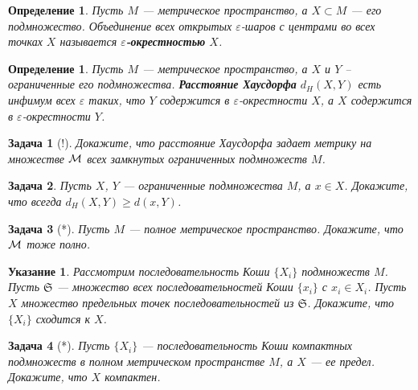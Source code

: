 \documentclass[12pt]{book}
\renewcommand{\epsilon}{\varepsilon}
\theoremstyle{upshape}
\newtheorem{zadacha}{Задача}[chapter]
\theoremstyle{generic}
\newtheorem{opredelenie}[teorema]{Определение}
\theoremstyle{upshapenonumber}
\newtheorem{ukazanie}{Указание}[section]
\newcommand{\следствие}{%
     \refstepcounter{teorema}
     {\noindent\bf Следствие \thechapter.\arabic{teorema}:\ }}
\newcommand{\пример}{%
     \refstepcounter{teorema}
     {\noindent\bf Пример \thechapter.\arabic{teorema}:\ }}
\newcommand{\лемма}{%
     \refstepcounter{teorema}
     {\noindent\bf Лемма \thechapter.\arabic{teorema}:\ }}
\newcommand{\теорема}{%
     \refstepcounter{teorema}
     {\noindent\bf Теорема \thechapter.\arabic{teorema}:\ }}
\newcommand{\утверждение}{%
     \refstepcounter{teorema}
     {\noindent\bf Утверждение \thechapter.\arabic{teorema}:\ }}
\begin{document}
{\begin{opredelenie} Пусть $M$ --- метрическое пространство,
а $X\subset M$ --- его подмножество. Объединение всех открытых
$\epsilon$-шаров с центрами во всех точках $X$ называется {\bf
$\epsilon$-окрестностью} $X$.
\end{opredelenie}

\begin{opredelenie} Пусть $M$ --- метрическое пространство, а $X$ и $Y$
-- ограниченные его подмножества. {\bf Расстояние Хаусдорфа}
$d_{H}(X,Y)$ есть инфимум всех $\epsilon$ таких, что $Y$ содержится
в $\epsilon$-окрестности $X$, а $X$ содержится в
$\epsilon$-окрестности $Y$.
\end{opredelenie}

\begin{zadacha}[!] Докажите, что расстояние Хаусдорфа
задает метрику на множестве $\cal M$ всех замкнутых ограниченных
подмножеств $M$.
\end{zadacha}

\begin{zadacha} Пусть $X$, $Y$ --- ограниченные подмножества $M$,
а $x\in X$. Докажите, что всегда $d_{H}(X, Y) \geq d(x, Y)$.
\end{zadacha}

\begin{zadacha}[*] Пусть $M$ --- полное метрическое
пространство. Докажите, что $\cal M$ тоже полно.
\end{zadacha}

\begin{ukazanie} Рассмотрим последовательность Коши
$\{ X_i\}$ подмножеств $M$. Пусть $\mathfrak S$ --- множество всех
последовательностей Коши $\{x_i\}$ с $x_i \in X_i$. Пусть $X$
множество предельных точек последовательностей из $\mathfrak
S$. Докажите, что $\{X_i\}$ сходится к $X$.
\end{ukazanie}

\begin{zadacha}[*] Пусть $\{ X_i\}$ --- последовательность Коши
компактных подмножеств в полном метрическом
пространстве $M$, а $X$ --- ее предел. Докажите, что $X$
компактен.
\end{zadacha}

}
\end{document}

